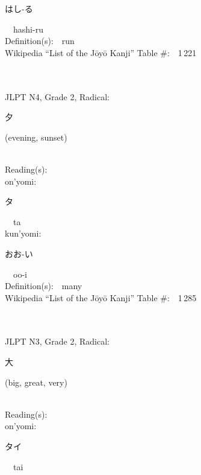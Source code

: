 \begin{multicols}{2}
{\hspace*{2em}}{\begin{CJK}{UTF8}{min} はし-る \end{CJK}}\ \ hashi-ru\ \ \\
Definition(s):\ \ run \\
Wikipedia ``List of the J\=oy\=o Kanji'' Table \#:\ \ 1\,221 \\
\ \ \\
{\fontsize{34pt}{40pt}  }\ \ \\  %
{JLPT N4, Grade 2, Radical:\ \ {\begin{CJK}{UTF8}{min} 夕 \end{CJK}} (evening, sunset) } \\
Reading(s):\ \ \\
{\hspace*{1em}}on'yomi:\ \ \\
{\hspace*{2em}}{\begin{CJK}{UTF8}{min} タ \end{CJK}}\ \ ta\ \ \\
{\hspace*{1em}}kun'yomi:\ \ \\
{\hspace*{2em}}{\begin{CJK}{UTF8}{min} おお-い \end{CJK}}\ \ oo-i\ \ \\
Definition(s):\ \ many \\
Wikipedia ``List of the J\=oy\=o Kanji'' Table \#:\ \ 1\,285 \\
\ \ \\
{\fontsize{34pt}{40pt}  }\ \ \\  %
{JLPT N3, Grade 2, Radical:\ \ {\begin{CJK}{UTF8}{min} 大 \end{CJK}} (big, great, very) } \\
Reading(s):\ \ \\
{\hspace*{1em}}on'yomi:\ \ \\
{\hspace*{2em}}{\begin{CJK}{UTF8}{min} タイ \end{CJK}}\ \ tai\ \ \\

\end{multicols}
